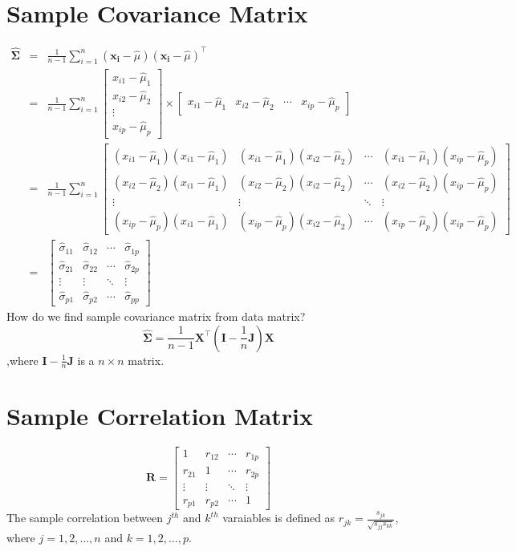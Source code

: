 \documentclass{article}
\begin{document}
\section{Sample Covariance Matrix}
\begin{eqnarray*}
\mathbf{\widehat{\Sigma}} &=& \frac{1}{n-1}\sum^n_{i=1}(\mathbf{x_i}-\hat{\mu})(\mathbf{x_i}-\hat{\mu})^\intercal\\
& = & 
\frac{1}{n-1}\sum^n_{i=1}
\begin{bmatrix}
x_{i1}-\hat{\mu}_1 \\ 
x_{i2}-\hat{\mu}_2 \\ 
\vdots \\ 
x_{ip}-\hat{\mu}_p 
\end{bmatrix}
\times 
\begin{bmatrix} 
x_{i1}-\hat{\mu}_1 & x_{i2}-\hat{\mu}_2 & \cdots & x_{ip}-\hat{\mu}_p
\end{bmatrix}\\
& = & 
\frac{1}{n-1}\sum^n_{i=1} 
\begin{bmatrix}
(x_{i1}-\hat{\mu}_1)(x_{i1}-\hat{\mu}_1) & (x_{i1}-\hat{\mu}_1)(x_{i2}-\hat{\mu}_2) & 
\cdots & 
(x_{i1}-\hat{\mu}_1)(x_{ip}-\hat{\mu}_p) \\ (x_{i2}-\hat{\mu}_2)(x_{i1}-\hat{\mu}_1) & (x_{i2}-\hat{\mu}_2)(x_{i2}-\hat{\mu}_2) & 
\cdots & 
(x_{i2}-\hat{\mu}_2)(x_{ip}-\hat{\mu}_p) \\ 
\vdots & \vdots & \ddots & \vdots \\ 
(x_{ip}-\hat{\mu}_p)(x_{i1}-\hat{\mu}_1) & (x_{ip}-\hat{\mu}_p)(x_{i2}-\hat{\mu}_2) & 
\cdots & 
(x_{ip}-\hat{\mu}_p)(x_{ip}-\hat{\mu}_p)
\end{bmatrix}\\
& = & 
\begin{bmatrix}
\hat{\sigma}_{11} & \hat{\sigma}_{12} & \cdots & \hat{\sigma}_{1p} \\ \hat{\sigma}_{21} & \hat{\sigma}_{22} & \cdots & \hat{\sigma}_{2p} \\ 
\vdots & \vdots & \ddots & \vdots \\ 
\hat{\sigma}_{p1} & \hat{\sigma}_{p2} & \cdots & \hat{\sigma}_{pp}
\end{bmatrix}
\end{eqnarray*}
How do we find sample covariance matrix from data matrix?
\[\mathbf{\widehat{\Sigma}}=\frac{1}{n-1}\mathbf{X}^\intercal(\mathbf{I}-\frac{1}{n}\mathbf{J})\mathbf{X}\],where $\mathbf{I}-\frac{1}{n}\mathbf{J}$ is a $n\times n$ matrix.

\section{Sample Correlation Matrix}
\[\mathbf{R}=
\begin{bmatrix}
1 & r_{12} & \cdots & r_{1p} \\ 
r_{21} & 1 & \cdots & r_{2p} \\ 
\vdots & \vdots & \ddots & \vdots \\ 
r_{p1} & r_{p2} & \cdots & 1
\end{bmatrix}\]
The sample correlation between $j^{th}$ and $k^{th}$ varaiables is defined as $r_{jk}=\frac{s_{jk}}{\sqrt{s_{jj}s_{kk}}}$, where $j = 1,2,\hdots,n$ and $k=1,2,\hdots,p$.
\end{document}
